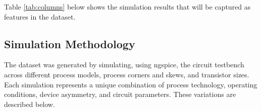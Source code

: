 \documentclass[10pt,twocolumn,letterpaper]{article}
\begin{document}
Table \ref{tab:columns} below shows the simulation results that will be captured as features in the dataset.

\begin{table}
    \centering
    \caption{Simulation Results as Dataset Features}
    \label{tab:columns}
\end{table}

\subsection{Simulation Methodology}
\label{subsec:simulation_methodology}

The dataset was generated by simulating, using ngspice, the circuit testbench across different process models, process corners and skews, and transistor sizes. Each simulation represents a unique combination of process technology, operating conditions, device asymmetry, and circuit parameters.  These variations are described below.\\
\end{document}
